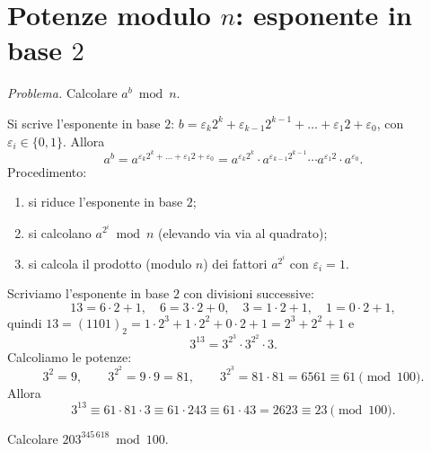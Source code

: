 \documentclass[11pt,a4paper]{article}
\begin{document}
\section{Potenze modulo $n$: esponente in base $2$}

\emph{Problema.} Calcolare $a^b \bmod n$.

Si scrive l'esponente in base $2$: $b = \varepsilon_k 2^k + \varepsilon_{k-1} 2^{k-1} + \dots + \varepsilon_1 2 + \varepsilon_0$, con $\varepsilon_i \in \{0, 1\}$. Allora
\[
  a^b = a^{\varepsilon_k 2^k + \dots + \varepsilon_1 2 + \varepsilon_0} = a^{\varepsilon_k 2^k}\cdot a^{\varepsilon_{k-1}2^{k-1}}\cdots a^{\varepsilon_1 2}\cdot a^{\varepsilon_0}.
\]
Procedimento:
\begin{enumerate}
  \item si riduce l'esponente in base $2$;
  \item si calcolano $a^{2^i} \bmod n$ (elevando via via al quadrato);
  \item si calcola il prodotto (modulo $n$) dei fattori $a^{2^i}$ con $\varepsilon_i = 1$.
\end{enumerate}

\begin{esempio}[$3^{13} \bmod 100$]
Scriviamo l'esponente in base $2$ con divisioni successive:
\[
  13 = 6\cdot 2 + 1,\quad 6 = 3\cdot 2 + 0,\quad 3 = 1\cdot 2 + 1,\quad 1 = 0\cdot 2 + 1,
\]
quindi $13 = (1101)_2 = 1\cdot 2^3 + 1\cdot 2^2 + 0\cdot 2 + 1 = 2^3 + 2^2 + 1$ e
\[
  3^{13} = 3^{2^3}\cdot 3^{2^2}\cdot 3 .
\]
Calcoliamo le potenze:
\[
  3^{2} = 9, \qquad 3^{2^2} = 9\cdot 9 = 81, \qquad 3^{2^3} = 81\cdot 81 = 6561 \equiv 61 \pmod{100}.
\]
Allora
\[
  3^{13} \equiv 61\cdot 81\cdot 3 \equiv 61\cdot 243 \equiv 61\cdot 43 = 2623 \equiv 23 \pmod{100}.
\]
\end{esempio}

\begin{esercizio}
Calcolare $203^{345\,618} \bmod 100$.
\end{esercizio}
\end{document}
